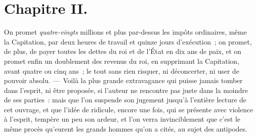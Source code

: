 \documentclass[french,twoside]{book} %
\begin{document}
\section[{Chapitre II.}]{Chapitre II.}
\noindent On promet {\itshape quatre-vingts} millions et plus par-dessus les impôts ordinaires, même la Capitation, par deux heures de travail et quinze jours d’exécution ; on promet, de plus, de payer toutes les dettes du roi et de l’État en dix ans de paix, et on promet enfin un doublement des revenus du roi, en supprimant la Capitation, avant quatre ou cinq ans ; le tout sans rien risquer, ni déconcerter, ni user de pouvoir absolu. — Voilà la plus grande extravagance qui puisse jamais tomber dans l’esprit, ni être proposée, si l’auteur ne rencontre pas juste dans la moindre de ses parties : mais que l’on suspende son jugement jusqu’à l’entière lecture de cet ouvrage, et que l’idée de ridicule, encore une fois, qui se présente avec violence à l’esprit, tempère un peu son ardeur, et l’on verra invinciblement que c’est le même procès qu’eurent les grands hommes qu’on a cités, au sujet des antipodes.\par
\end{document}
